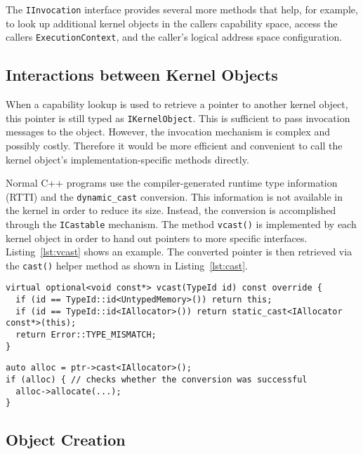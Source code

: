 The \texttt{IInvocation} interface provides several more methods that
help, for example, to look up additional kernel objects in the callers
capability space, access the callers \texttt{ExecutionContext}, and
the caller's logical address space configuration.

\subsection{Interactions between Kernel Objects}

When a capability lookup is used to retrieve a pointer to another
kernel object, this pointer is still typed as
\texttt{IKernelObject}. This is sufficient to pass invocation messages
to the object. However, the invocation mechanism is complex and
possibly costly. Therefore it would be more efficient and convenient
to call the kernel object's implementation-specific methods
directly.

Normal C++ programs use the compiler-generated runtime type
information (RTTI) and the \texttt{dynamic\_cast} conversion. This
information is not available in the kernel in order to reduce its
size. Instead, the conversion is accomplished through the
\texttt{ICastable} mechanism. The method \texttt{vcast()} is
implemented by each kernel object in order to hand out pointers to
more specific interfaces. Listing~\ref{lst:vcast} shows an example.
The converted pointer is then retrieved via the \texttt{cast()} helper
method as shown in Listing~\ref{lst:cast}.

\begin{lstlisting}[float, label=lst:vcast, caption=Example run-time type conversion in the \texttt{UntypedMemory} object.]
virtual optional<void const*> vcast(TypeId id) const override {
  if (id == TypeId::id<UntypedMemory>()) return this;
  if (id == TypeId::id<IAllocator>()) return static_cast<IAllocator const*>(this);
  return Error::TYPE_MISMATCH;
}
\end{lstlisting}

\begin{lstlisting}[float, label=lst:cast, caption=Casting a kernel object into a more specific type.]
auto alloc = ptr->cast<IAllocator>();
if (alloc) { // checks whether the conversion was successful
  alloc->allocate(...);
}
\end{lstlisting}



\subsection{Object Creation}

